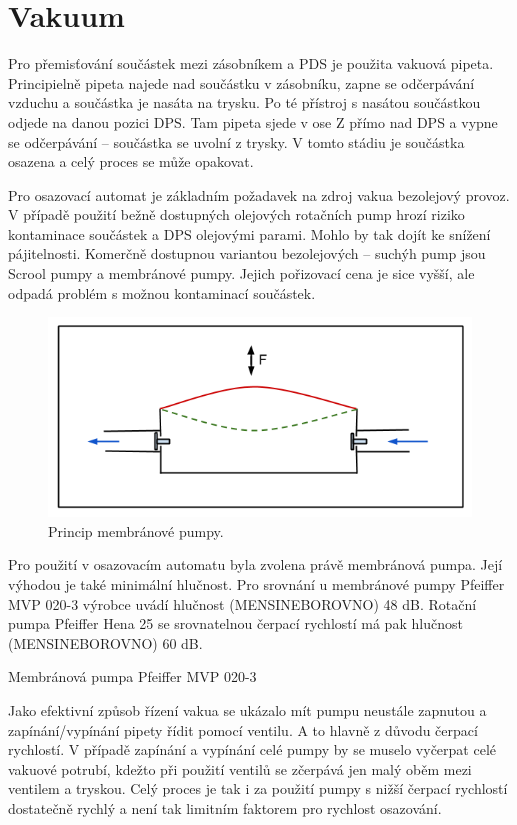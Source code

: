 \chapter{Vakuum}

Pro přemisťování součástek mezi zásobníkem a PDS je použita vakuová pipeta. Principielně pipeta najede nad součástku v zásobníku, zapne se odčerpávání vzduchu a součástka je nasáta na trysku. Po té přístroj s nasátou součástkou odjede na danou pozici DPS. Tam pipeta sjede v ose Z přímo nad DPS a vypne se odčerpávání – součástka se uvolní z trysky. V tomto stádiu je součástka osazena a celý proces se může opakovat.

Pro osazovací automat je základním požadavek na zdroj vakua bezolejový provoz. V případě použití bežně dostupných olejových rotačních pump hrozí riziko kontaminace součástek a DPS olejovými parami. Mohlo by tak dojít ke snížení pájitelnosti. Komerčně dostupnou variantou bezolejových – suchýh pump jsou Scrool pumpy a membránové pumpy. Jejich pořizovací cena je sice vyšší, ale odpadá problém s možnou kontaminací součástek.

\begin{figure}[h!]
  \centering
    \includegraphics[width=0.6\linewidth]{obrazky/membrane.png}%
    \caption{Princip membránové pumpy.}
    \label{fig:membranka}
\end{figure}

Pro použití v osazovacím automatu byla zvolena právě membránová pumpa. Její výhodou je také minimální hlučnost. Pro srovnání u membránové pumpy Pfeiffer MVP 020-3 výrobce uvádí hlučnost (MENSINEBOROVNO) 48 dB. Rotační pumpa Pfeiffer Hena 25 se srovnatelnou čerpací rychlostí má pak hlučnost (MENSINEBOROVNO) 60 dB.

Membránová pumpa Pfeiffer MVP 020-3


Jako efektivní způsob řízení vakua se ukázalo mít pumpu neustále zapnutou a zapínání/vypínání pipety řídit pomocí ventilu. A to hlavně z důvodu čerpací rychlostí. V případě zapínání a vypínání celé pumpy by se muselo vyčerpat celé vakuové potrubí, kdežto při použití ventilů se zčerpává jen malý oběm mezi ventilem a tryskou. Celý proces je tak i za použití pumpy s nižší čerpací rychlostí dostatečně rychlý a není tak limitním faktorem pro rychlost osazování.

